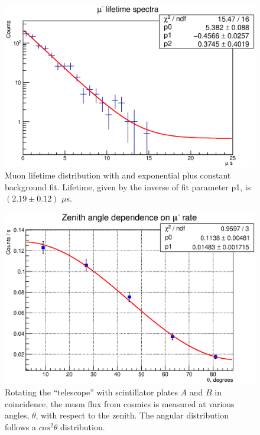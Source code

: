 \documentclass[11pt,twocolumn]{article}
\begin{document}
\begin{figure}[h]
\begin{center}
\includegraphics[scale=0.62]{mu_lifetime_final.eps}
\caption{Muon lifetime distribution with and exponential plus constant background fit. Lifetime, given by the inverse of fit parameter p1, is $(2.19 \pm 0.12)$ $\mu$s.}
\end{center}
\end{figure}
\begin{figure}[h]
\begin{center}
\includegraphics[scale=0.6]{zenith.eps}
\caption{Rotating the ``telescope'' with scintillator plates $A$ and $B$ in coincidence, the muon flux from cosmics is measured at various angles, $\theta$, with respect to the zenith. The angular distribution follows a $cos^2\theta$ distribution.}
\end{center}
\end{figure}
\end{document}
